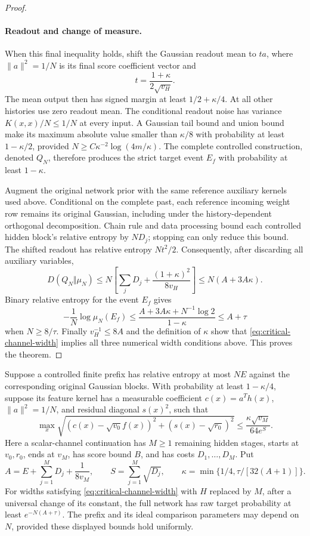 \begin{proof}
\paragraph{Readout and change of measure.}
When this final inequality holds, shift the Gaussian readout mean to
$ta$, where $\|a\|^2=1/N$ is its final score coefficient vector and
\[
 t=\frac{1+\kappa}{2\sqrt{v_H}}.
\]
The mean output then has signed margin at least $1/2+\kappa/4$.
At all other histories use zero readout mean.  The conditional readout
noise has variance $K(x,x)/N\le1/N$ at every input.  A Gaussian tail
bound and union bound make its maximum absolute value smaller than
$\kappa/8$ with probability at least $1-\kappa/2$, provided
$N\ge C\kappa^{-2}\log(4m/\kappa)$.  The complete controlled
construction, denoted $Q_N$, therefore produces the strict target
event $E_f$ with probability at least $1-\kappa$.

Augment the original network prior with the same reference auxiliary
kernels used above.  Conditional on the complete past, each reference
incoming weight row remains its original Gaussian, including under
the history-dependent orthogonal decomposition.  Chain rule and data
processing bound each controlled hidden block's relative entropy by
$ND_j$; stopping can only reduce this bound.  The shifted readout
has relative entropy $Nt^2/2$.  Consequently, after discarding all
auxiliary variables,
\[
 D(Q_N\Vert\mu_N)\le
 N\left[\sum_jD_j+\frac{(1+\kappa)^2}{8v_H}\right]
 \le N(A+3A\kappa).
\]
Binary relative entropy for the event $E_f$ gives
\[
 -\frac1N\log\mu_N(E_f)
 \le\frac{A+3A\kappa+N^{-1}\log2}{1-\kappa}
 \le A+\tau
\]
when $N\ge8/\tau$.  Finally $v_H^{-1}\le8A$ and the definition
of $\kappa$ show that \eqref{eq:critical-channel-width} implies
all three numerical width conditions above.  This proves the theorem.
\end{proof}

\begin{corollary}
\label{cor:critical-channel-approximate-prefix}
Suppose a controlled finite prefix has relative entropy at most $NE$
against the corresponding original Gaussian blocks.  With probability
at least $1-\kappa/4$, suppose its feature kernel has a measurable
coefficient $c(x)=a^Th(x)$, $\|a\|^2=1/N$, and residual diagonal
$s(x)^2$, such that
\[
 \max_x\sqrt{(c(x)-\sqrt{v_0}f(x))^2+
                            (s(x)-\sqrt{r_0})^2}
 \le\frac{\kappa\sqrt{v_M}}{64e^S}.
\]
Here a scalar-channel continuation has $M\ge1$ remaining hidden
stages, starts at $v_0,r_0$, ends at $v_M$, has score bound $B$, and
has costs $D_1,\ldots,D_M$.  Put
\[
 A=E+\sum_{j=1}^M D_j+\frac1{8v_M},\qquad
 S=\sum_{j=1}^M\sqrt{D_j},\qquad
 \kappa=\min\{1/4,\tau/[32(A+1)]\}.
\]
For widths satisfying \eqref{eq:critical-channel-width} with $H$
replaced by $M$, after a universal change of its constant, the full
network has raw target probability at least $e^{-N(A+\tau)}$.
The prefix and its ideal comparison parameters may depend on $N$,
provided these displayed bounds hold uniformly.
\end{corollary}

